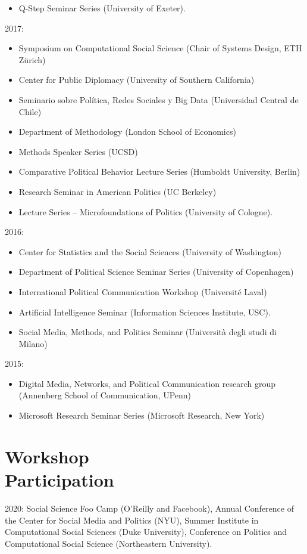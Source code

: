 \documentclass[margin,line,11pt]{resume}
\begin{document}
\begin{resume}
\begin{itemize}
\item Q-Step Seminar Series (University of Exeter).
\end{itemize}
2017:    
\begin{itemize}
\item Symposium on Computational Social Science (Chair of Systems Design, ETH Z\"{u}rich)
\item Center for Public Diplomacy (University of Southern California)
\item Seminario sobre Pol\'{i}tica, Redes Sociales y Big Data (Universidad Central de Chile)
\item Department of Methodology (London School of Economics)
\item Methods Speaker Series (UCSD)
\item Comparative Political Behavior Lecture Series (Humboldt University, Berlin)
\item Research Seminar in American Politics (UC Berkeley)
\item Lecture Series -- Microfoundations of Politics (University of Cologne).
\end{itemize}
2016:
\begin{itemize}
\item Center for Statistics and the Social Sciences (University of Washington)
\item Department of Political Science Seminar Series (University of Copenhagen)
\item International Political Communication Workshop (Universit\'{e} Laval)
\item Artificial Intelligence Seminar (Information Sciences Institute, USC).
\item Social Media, Methods, and Politics Seminar (Universit\`{a} degli studi di Milano)
\end{itemize}
2015:
\begin{itemize}
\item Digital Media, Networks, and Political Communication research group (Annenberg School of Communication, UPenn)
\item Microsoft Research Seminar Series (Microsoft Research, New York)
\end{itemize}

\newpage     
  
        \section{\mysidestyle Workshop\\Participation}
2020: Social Science Foo Camp (O'Reilly and Facebook), Annual Conference of the Center for Social Media and Politics (NYU), Summer Institute in Computational Social Sciences (Duke University), Conference on Politics and Computational Social Science (Northeastern University).
        

\end{resume}
\end{document}
